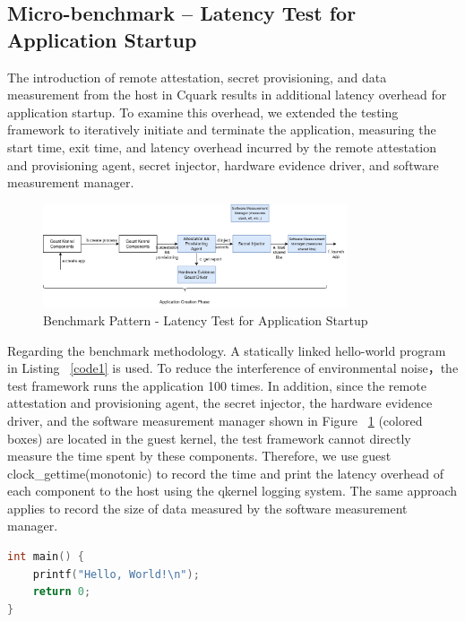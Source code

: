 \subsection{Micro-benchmark – Latency Test for Application Startup}
The introduction of remote attestation, secret provisioning, and data measurement from the host in Cquark results in additional latency overhead for application startup. To examine this overhead, we extended the testing framework to iteratively initiate and terminate the application, measuring the 
start time, exit time, and latency overhead incurred by the remote attestation and provisioning agent, secret injector, hardware evidence driver, and software measurement manager.

\begin{figure}[H]
    \centering
    \includegraphics[width=0.8\textwidth]{images/micro_benchmark_app_life_cycle_bencmark_pattern.png}
    \caption[Benchmark Pattern - Latency Test for Application Startup]{Benchmark Pattern - Latency Test for Application Startup}
    \label{fig:micro_benchmark_app_life_cycle_bencmark_pattern}
\end{figure}


Regarding the benchmark methodology. A statically linked hello-world program in Listing ~\ref{code1} is used. To reduce the interference of environmental noise，the test framework runs the application 100 times. In addition, since the remote attestation and provisioning agent, the secret injector, 
the hardware evidence driver, and the software measurement manager shown in Figure  ~\ref{fig:micro_benchmark_app_life_cycle_bencmark_pattern}  (colored boxes) are located in the guest kernel, the test framework cannot directly measure the time spent by these components. Therefore, we use guest clock\_gettime(monotonic) to record the time and print the 
latency overhead of each component to the host using the qkernel logging system. The same approach applies to record the size of data measured by the software measurement manager. 

\begin{lstlisting}[language=C,frame=single,caption=Hello World Program,label=code1]
int main() {
    printf("Hello, World!\n");
    return 0;
}
\end{lstlisting}


